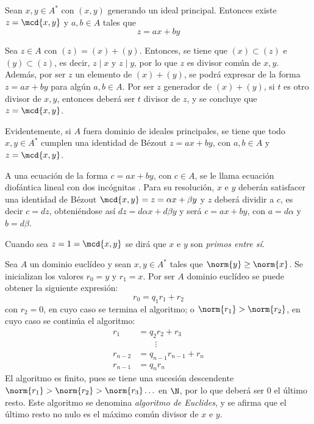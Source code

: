 \begin{prop}
\item Sean $x,y\in A^*$ con $(x,y)$ generando un ideal principal. Entonces existe $z = \mcd{x,y}$ y $a,b\in A$ tales que \[z = ax + by\]
\end{prop}

\begin{dem}{\cite[p.~42]{GamboaAnillos}}
    Sea $z\in A$ con $(z) = (x) + (y)$. Entonces, se tiene que $(x) \subset (z)$ e $(y) \subset (z)$, es decir, $z\mid x$ y $z\mid y$, por lo que $z$ es divisor común de $x,y$. Además, por ser $z$ un elemento de $(x) + (y)$, se podrá expresar de la forma $z = ax + by$ para algún $a,b\in A$. Por ser $z$ generador de $(x) + (y)$, si $t$ es otro divisor de $x,y$, entonces deberá ser $t$ divisor de $z$, y se concluye que $z = \mcd{x,y}$.
\end{dem}

\begin{obss}
    \item Evidentemente, si $A$ fuera dominio de ideales principales, se tiene que todo $x,y\in A^*$ cumplen una identidad de Bézout $z = ax + by$, con $a,b\in A$ y $z = \mcd{x,y}$.

    \item A una ecuación de la forma $c = ax + by$, con $c\in A$, se le llama ecuación diofántica lineal con dos incógnitas \cite[p.~50]{GamboaAnillos}. Para su resolución, $x$ e $y$ deberán satisfacer una identidad de Bézout $\mcd{x,y} = z = \alpha x + \beta y$ y $z$ deberá dividir a $c$, es decir $c = dz$, obteniéndose así $dz = d\alpha x + d\beta y$ y será $c = ax + by$, con $a = d\alpha$ y $b = d\beta$.

    \item Cuando sea $z = 1 = \mcd{x,y}$ se dirá que $x$ e $y$ son \textit{primos entre sí}. 
    
\end{obss}

\begin{prop}
    \item Sea $A$ un dominio euclídeo y sean $x,y\in A^*$ tales que $\norm{y} \geq \norm{x}$. Se inicializan los valores $r_0 = y$ y $r_1 = x$. Por ser $A$ dominio euclídeo se puede obtener la siguiente expresión: 
    \[
    r_0 = q_1r_1 + r_2
    \]
    con $r_2 = 0$, en cuyo caso se termina el algoritmo; o $\norm{r_1}> \norm{r_2}$, en cuyo caso se continúa el algoritmo:    \vspace{-0.5em}
        \begin{align*}
            r_1 &= q_2r_2 + r_3 \\
            &\quad \quad\vdots\\
            r_{n-2} &= q_{n-1}r_{n-1} + r_n\\
            r_{n-1} &= q_nr_n
        \end{align*} 
    El algoritmo es finito, pues se tiene una sucesión descendente $\norm{r_1} > \norm{r_2}> \norm{r_3}\ldots$ en $\N$, por lo que deberá ser 0 el último resto. Este algoritmo se denomina \textit{algoritmo de Euclides}, y se afirma que el último resto no nulo es el máximo común divisor de $x$ e $y$.    
\end{prop}

